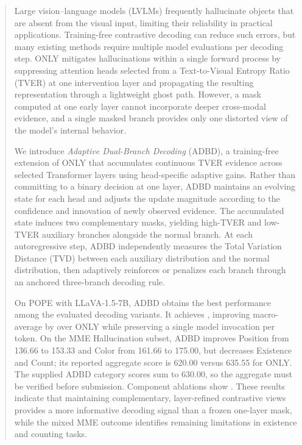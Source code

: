 \begin{abstract}
Large vision--language models (LVLMs) frequently hallucinate objects that are absent from the visual input, limiting their reliability in practical applications. Training-free contrastive decoding can reduce such errors, but many existing methods require multiple model evaluations per decoding step. ONLY mitigates hallucinations within a single forward process by suppressing attention heads selected from a Text-to-Visual Entropy Ratio (TVER) at one intervention layer and propagating the resulting representation through a lightweight ghost path. However, a mask computed at one early layer cannot incorporate deeper cross-modal evidence, and a single masked branch provides only one distorted view of the model's internal behavior.

We introduce \emph{Adaptive Dual-Branch Decoding} (ADBD), a training-free extension of ONLY that accumulates continuous TVER evidence across selected Transformer layers using head-specific adaptive gains. Rather than committing to a binary decision at one layer, ADBD maintains an evolving state for each head and adjusts the update magnitude according to the confidence and innovation of newly observed evidence. The accumulated state induces two complementary masks, yielding high-TVER and low-TVER auxiliary branches alongside the normal branch. At each autoregressive step, ADBD independently measures the Total Variation Distance (TVD) between each auxiliary distribution and the normal distribution, then adaptively reinforces or penalizes each branch through an anchored three-branch decoding rule.

On POPE with LLaVA-1.5-7B, ADBD obtains the best performance among the evaluated decoding variants. It achieves , improving macro-average  by  over ONLY while preserving a single model invocation per token. On the MME Hallucination subset, ADBD improves Position from 136.66 to 153.33 and Color from 161.66 to 175.00, but decreases Existence and Count; its reported aggregate score is 620.00 versus 635.55 for ONLY. The supplied ADBD category scores sum to 630.00, so the aggregate must be verified before submission. Component ablations show . These results indicate that maintaining complementary, layer-refined contrastive views provides a more informative decoding signal than a frozen one-layer mask, while the mixed MME outcome identifies remaining limitations in existence and counting tasks.
\end{abstract}
